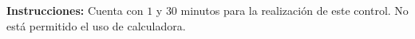  
\textbf{Instrucciones:} Cuenta con $1$ y $30$ minutos para la realización de este control. No está permitido el uso de calculadora.
 
